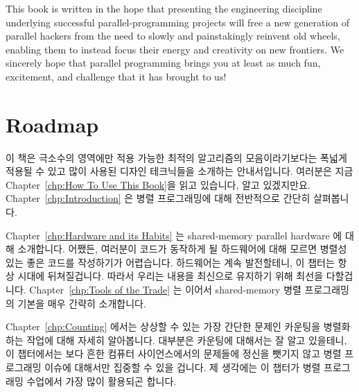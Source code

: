 This book is written in the hope that presenting the engineering
discipline underlying successful
parallel-programming projects will free a new generation of parallel hackers
from the need to slowly and painstakingly reinvent old wheels, enabling
them to instead focus their energy and creativity on new frontiers.
We sincerely hope that parallel programming brings you at least as
much fun, excitement, and challenge that it has brought to us!
\fi

\section{Roadmap}
\label{sec:howto:Roadmap}

이 책은 극소수의 영역에만 적용 가능한 최적의 알고리즘의 모음이라기보다는 폭넓게
적용될 수 있고 많이 사용된 디자인 테크닉들을 소개하는 안내서입니다.
여러분은 지금 Chapter~\ref{chp:How To Use This Book}을 읽고 있습니다, 알고
있겠지만요.
Chapter~\ref{chp:Introduction} 은 병렬 프로그래밍에 대해 전반적으로 간단히
살펴봅니다.
\iffalse

This book is a handbook of widely applicable and heavily
used design techniques, rather than
a collection of optimal algorithms with tiny areas of applicability.
You are currently reading Chapter~\ref{chp:How To Use This Book}, but
you knew that already.
Chapter~\ref{chp:Introduction} gives a high-level overview of parallel
programming.
\fi

Chapter~\ref{chp:Hardware and its Habits} 는 shared-memory parallel hardware 에
대해 소개합니다.
어쨌든, 여러분이 코드가 동작하게 될 하드웨어에 대해 모르면 병렬성 있는 좋은
코드를 작성하기가 어렵습니다.
하드웨어는 계속 발전할테니, 이 챕터는 항상 시대에 뒤쳐질겁니다.
따라서 우리는 내용을 최신으로 유지하기 위해 최선을 다할겁니다.
Chapter~\ref{chp:Tools of the Trade} 는 이어서 shared-memory 병렬 프로그래밍의
기본을 매우 간략히 소개합니다.
\iffalse

Chapter~\ref{chp:Hardware and its Habits} introduces shared-memory
parallel hardware.
After all, it is difficult to write good parallel code unless you
understand the underlying hardware.
Because hardware constantly evolves, this chapter will always be
out of date.
We will nevertheless do our best to keep up.
Chapter~\ref{chp:Tools of the Trade} then provides a very brief overview
of common shared-memory parallel-programming primitives.
\fi

Chapter~\ref{chp:Counting} 에서는 상상할 수 있는 가장 간단한 문제인 카운팅을
병렬화 하는 작업에 대해 자세히 알아봅니다.
대부분은 카운팅에 대해서는 잘 알고 있을테니, 이 챕터에서는 보다 흔한 컴퓨터
사이언스에서의 문제들에 정신을 뺏기지 않고 병렬 프로그래밍 이슈에 대해서만
집중할 수 있을 겁니다.
제 생각에는 이 챕터가 병렬 프로그래밍 수업에서 가장 많이 활용되곤 합니다.
\iffalse

